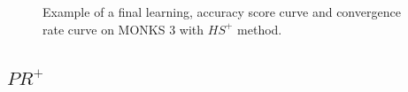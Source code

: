 \begin{appendices}
\begin{figure}[H]
\begin{subfigure}{0.40\textwidth}
                    \label{fig:monks_3_ACC_CGD}
                \end{subfigure}
                \begin{subfigure}{0.40\textwidth}
                    \caption{}
                    \label{fig:monks_3_NORM_CGD}
                \end{subfigure}
                \caption{Example of a final learning, accuracy score curve and
                convergence rate curve on MONKS 3 with $HS^+$ method.}
                \label{fig:monks_3_CGD}
            \end{figure}


            \subsection{$PR^+$} %
            \label{sub:pr}


\end{appendices}
